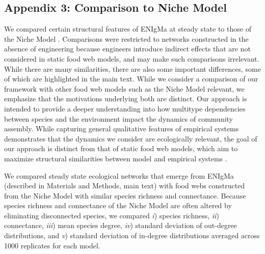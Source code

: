 \documentclass[twocolumn,preprintnumbers,amsmath,amssymb,superscriptaddress,linenumbers]{revtex4-1}
\begin{document}
\subsection*{Appendix 3: Comparison to Niche Model}
We compared certain structural features of ENIgMa at steady state to those of the Niche Model \cite{Williams2000}.
Comparisons were restricted to networks constructed in the absence of engineering because engineers introduce indirect effects that are not considered in static food web models, and may make such comparisons irrelevant.
While there are many similarities, there are also some important differences, some of which are highlighted in the main text.
While we consider a comparison of our framework with other food web models such as the Niche Model relevant, we emphasize that the motivations underlying both are distinct.
Our approach is intended to provide a deeper understanding into how multitype dependencies between species and the environment impact the dynamics of community assembly.
While capturing general qualitative features of empirical systems demonstrates that the dynamics we consider are ecologically relevant, the goal of our approach is distinct from that of static food web models, which aim to maximize structural similarities between model and empirical systems \cite{Williams2000,Williams2011}.

We compared steady state ecological networks that emerge from ENIgMa (described in Materials and Methods, main text) with food webs constructed from the Niche Model \cite{Williams2000} with similar species richness and connectance.
Because species richness and connectance of the Niche Model are often altered by eliminating disconnected species, we compared
\emph{i}) species richness,
\emph{ii}) connectance,
\emph{iii}) mean species degree,
\emph{iv}) standard deviation of out-degree distributions, and
\emph{v}) standard deviation of in-degree distributions
averaged across 1000 replicates for each model.
\end{document}
